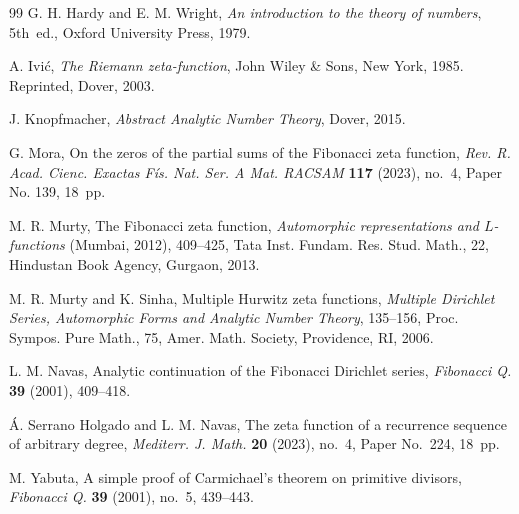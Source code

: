 \documentclass[11pt, a4paper]{article}
\theoremstyle{plain}
\theoremstyle{definition}
\begin{document}
\begin{thebibliography}{99}
G. H. Hardy and E. M. Wright,
\textit{An introduction to the theory of numbers},
5th~ed., Oxford University Press, 1979.

A. Ivi\'c,  
\textit{The Riemann zeta-function}, John Wiley \& Sons,
New York, 1985. Reprinted, Dover, 2003.


J. Knopfmacher, %
\textit{Abstract Analytic Number Theory}, Dover, 2015.

G. Mora,
On the zeros of the partial sums of the Fibonacci zeta function,
\textit{Rev. R. Acad. Cienc. Exactas F\'is. Nat. Ser. A Mat. RACSAM} 
\textbf{117} (2023), no.~4, Paper No. 139, 18~pp.

M. R. Murty, 
{The Fibonacci zeta function}, 
\textit{Automorphic representations and $L$-functions} (Mumbai, 2012), 409--425, 
Tata Inst. Fundam. Res. Stud. Math., {22}, Hindustan Book Agency, Gurgaon, 2013.

M. R. Murty and K. Sinha,  
{Multiple Hurwitz zeta functions}, 
\textit{Multiple Dirichlet Series, Automorphic Forms and Analytic Number Theory}, 
135--156, Proc. Sympos. Pure Math., {75}, Amer. Math. Society, Providence, RI, 2006.

L. M. Navas, 
Analytic continuation of the Fibonacci Dirichlet series, 
\textit{Fibonacci Q.} \textbf{39} (2001), 409--418.


\'A. Serrano Holgado and L. M. Navas,
The zeta function of a recurrence sequence of arbitrary degree,
\textit{Mediterr. J. Math.} \textbf{20} (2023), no.~4, Paper No.~224, 18~pp.

M. Yabuta, 
A simple proof of Carmichael's theorem on primitive divisors,
\textit{Fibonacci Q.} \textbf{39} (2001), no.~5, 439--443.

\end{thebibliography}

\end{document}
